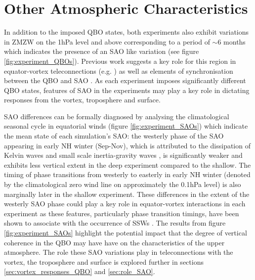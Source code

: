 \section{Other Atmospheric Characteristics}

In addition to the imposed QBO states, both experiments also exhibit variations in ZMZW on the 1hPa level and above corresponding to a period of $\sim$6 months which indicates the presence of an SAO like variation (see figure \ref{fig:experiment_QBOs}). Previous work suggests a key role for this region in equator-vortex teleconnections (e.g. \cite{grayForecasting2020}) as well as elements of synchronisation between the QBO and SAO \citep{kuaiNonstationary2009c}. As each experiment imposes significantly different QBO states, features of SAO in the experiments may play a key role in dictating responses from the vortex, troposphere and surface.

SAO differences can be formally diagnosed by analysing the climatological seasonal cycle in equatorial winds (figure \ref{fig:experiment_SAOs}) which indicate the mean state of each simulation's SAO: the westerly phase of the SAO appearing in early NH winter (Sep-Nov), which is attributed to the dissipation of Kelvin waves and small scale inertia-gravity waves \citep{dunkertonRole1979, hitchmanEstimation1988}, is significantly weaker and exhibits less vertical extent in the deep experiment compared to the shallow. The timing of phase transitions from westerly to easterly in early NH winter (denoted by the climatological zero wind line on approximately the 0.1hPa level) is also marginally later in the shallow experiment. These differences in the extent of the westerly SAO phase could play a key role in equator-vortex interactions in each experiment as these features, particularly phase transition timings, have been shown to associate with the occurrence of SSWs \citep{grayData2001, hamiltonEffects1998}. The results from figure \ref{fig:experiment_SAOs} highlight the potential impact that the degree of vertical coherence in the QBO may have have on the characteristics of the upper atmosphere. The role these SAO variations play in teleconnections with the vortex, the troposphere and surface is explored further in sections \ref{sec:vortex_responses_QBO} and \ref{sec:role_SAO}.

